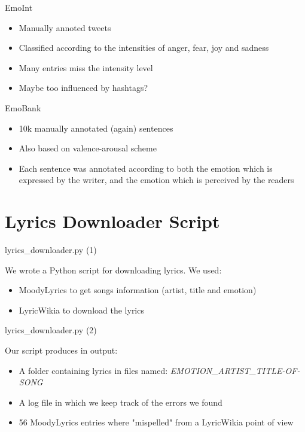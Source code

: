 \documentclass[xcolor=dvipsnames]{beamer}
\begin{document}
\begin{frame}{EmoInt \cite{p10}}
\begin{itemize}
\item Manually annoted tweets
\item Classified according to the intensities of anger, fear, joy and sadness
\item Many entries miss the intensity level
\item Maybe too influenced by hashtags?
\end{itemize}
\end{frame}

\begin{frame}{EmoBank \cite{p11}}

\begin{itemize}
\item 10k manually annotated (again) sentences
\item Also based on valence-arousal scheme
\item  Each sentence was annotated according to both the emotion which is expressed by the writer, and the emotion which is perceived by the readers
\end{itemize}

\end{frame}


\section{Lyrics Downloader Script}
\begin{frame}{lyrics\_downloader.py (1)}

We wrote a Python script for downloading lyrics. We used:
\begin{itemize}
\item MoodyLyrics to get songs information (artist, title and emotion)
\item LyricWikia to download the lyrics
\end{itemize}

\end{frame}

\begin{frame}{lyrics\_downloader.py (2)}

Our script produces in output:
\begin{itemize}
\item A folder containing lyrics in files named: \textit{EMOTION\_ARTIST\_TITLE-OF-SONG}
\item A log file in which we keep track of the errors we found
\item 56 MoodyLyrics entries where "mispelled" from a LyricWikia point of view
\end{itemize}

\end{frame}
\end{document}
